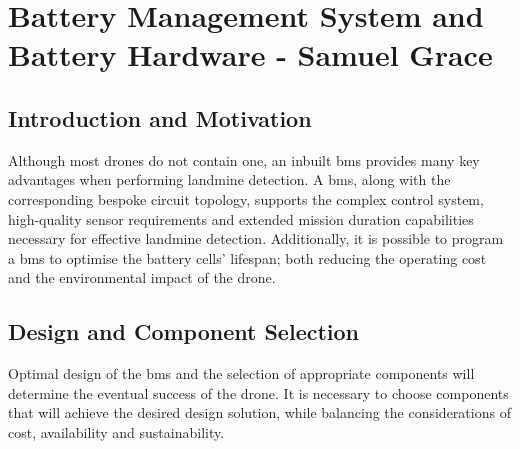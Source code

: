 


\section{Battery Management System and Battery Hardware - Samuel Grace}
\label{sec:bms}
\subsection{Introduction and Motivation}

Although most drones do not contain one, an inbuilt \gls{bms} \cite{SON2023120186} provides many key advantages when performing landmine detection. A \acrshort{bms}, along with the corresponding bespoke circuit topology, supports the complex control system, high-quality sensor requirements and extended mission duration capabilities necessary for effective landmine detection. Additionally, it is possible to program a \acrshort{bms} to optimise the battery cells’ lifespan; both reducing the operating cost and the environmental impact of the drone.

\subsection{Design and Component Selection}

Optimal design of the \acrshort{bms} and the selection of appropriate components will determine the eventual success of the drone. It is necessary to choose components that will achieve the desired design solution, while balancing the considerations of cost, availability and sustainability.


